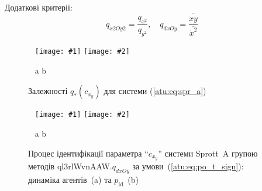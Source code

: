 \documentclass[14pt,handout,utf8]{beamer}
\newcommand{\ABlbl}{%
  \vspace{-2.9ex}
  \begin{center}
    ~ \hfill a \hfill\hfill b \hfill ~
  \end{center}
  \vspace{-2.0ex}
}
\newcommand{\PicDouble}[2]{%
 \begin{center}
    ~ \hfill
    \texttt{[image: \#1]}
    \hfill
    \texttt{[image: \#2]}
    \hfill ~
  \end{center}
  \ABlbl
}
\begin{document}

\begin{frame}
  \frametitle{~}

  Додаткові критерії:
  \[
    q_{x2Oy2} = \frac{q_{x^2}}{q_{y^2}},
    \quad
    q_{dxOy} =
    \frac{\overline{\dot{x}y}}{\overline{\dot{x}^2}}
  \]

\begin{figure}
  \PicDouble{../p5/p/cha/spr_a/sprott_a_q-p_c_x_y.png}{../p5/p/cha/spr_a/sprott_a_q2-p_c_x_y2.png}
  \caption{Залежності $q_{*}(c_{x_y})$ для системи (\ref{atu:eq:spr_a})}
  \label{atu:f:spr_a_q}
\end{figure}

  \begin{figure}[htb!]
    \PicDouble{../p5/p/cha/spr_a/ql3rlWvnAAW_dxOy/sprott_a_id2-p_t_pi_ql3rlWvnAAW_sign.png}{../p5/p/cha/spr_a/ql3rlWvnAAW_dxOy/sprott_a_id2-p_t_p_ql3rlWvnAAW_sign.png}
    \caption{Процес ідентифікації параметра ``$c_{x_y}$'' системи Sprott~A групою методів ql3rlWvnAAW.$q_{dxOy}$ за умови~(\ref{atu:eq:po_t_sign}): динаміка агентів~(a) та $p_\mathrm{id}$~(b)}
    \label{atu:f:spr_a_id_ql3rlWvnAAW_q_dxOy_sign}
  \end{figure}


\end{frame}



\end{document}
